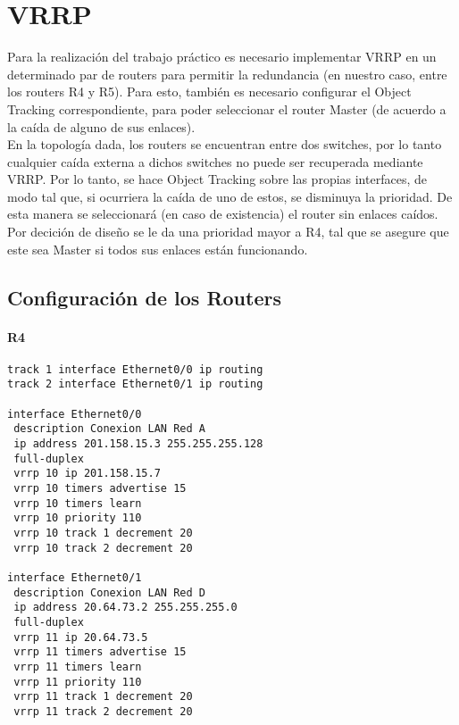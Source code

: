 \section{VRRP}
Para la realización del trabajo práctico es necesario implementar VRRP en un determinado par de routers para permitir la redundancia (en nuestro caso, entre los routers R4 y R5).
Para esto, también es necesario configurar el Object Tracking correspondiente, para poder seleccionar el router Master (de acuerdo a la caída de alguno de sus enlaces).
\\
En la topología dada, los routers se encuentran entre dos switches, por lo tanto cualquier caída externa a dichos switches no puede ser recuperada mediante VRRP.
Por lo tanto, se hace Object Tracking sobre las propias interfaces, de modo tal que, si ocurriera la caída de uno de estos, se disminuya la prioridad. De esta manera se seleccionará (en caso de existencia) el router sin enlaces caídos. \\
Por decición de diseño se le da una prioridad mayor a R4, tal que se asegure que este sea Master si todos sus enlaces están funcionando.

\subsection{Configuración de los Routers}
\paragraph{R4}
{\small
\begin{verbatim}
track 1 interface Ethernet0/0 ip routing
track 2 interface Ethernet0/1 ip routing

interface Ethernet0/0
 description Conexion LAN Red A
 ip address 201.158.15.3 255.255.255.128
 full-duplex
 vrrp 10 ip 201.158.15.7
 vrrp 10 timers advertise 15
 vrrp 10 timers learn
 vrrp 10 priority 110
 vrrp 10 track 1 decrement 20
 vrrp 10 track 2 decrement 20

interface Ethernet0/1
 description Conexion LAN Red D
 ip address 20.64.73.2 255.255.255.0
 full-duplex
 vrrp 11 ip 20.64.73.5
 vrrp 11 timers advertise 15
 vrrp 11 timers learn
 vrrp 11 priority 110
 vrrp 11 track 1 decrement 20
 vrrp 11 track 2 decrement 20
\end{verbatim}
}

